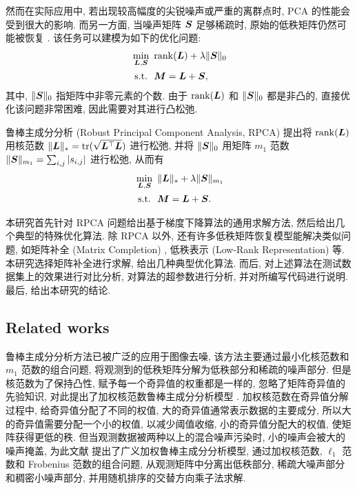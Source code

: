 \documentclass[12pt]{article}
\begin{document}
然而在实际应用中, 若出现较高幅度的尖锐噪声或严重的离群点时, PCA 的性能会受到很大的影响. 而另一方面, 当噪声矩阵 $\bm{S}$ 足够稀疏时, 原始的低秩矩阵仍然可能被恢复 \cite{shi2013low}. 该任务可以建模为如下的优化问题: 
\begin{equation}
  \begin{aligned}
    &\min_{\bm{L},\bm{S}}~\operatorname{rank}(\bm{L})+\lambda\|\bm{S}\|_0 \\
    &~\text{s.t.}~~\bm{M}=\bm{L}+\bm{S},
  \end{aligned}
\end{equation}
其中, $\|\bm{S}\|_0$ 指矩阵中非零元素的个数. 由于 $\operatorname{rank}(\bm{L})$ 和 $\|\bm{S}\|_0$ 都是非凸的, 直接优化该问题非常困难, 因此需要对其进行凸松弛. 

鲁棒主成分分析 (Robust Principal Component Analysis, RPCA) \cite{candes2011robust} 提出将 $\operatorname{rank}(\bm{L})$ 用核范数 $\|\bm{L}\|_{*}=\operatorname{tr}(\sqrt{\bm{L}^\top\bm{L}})$ 进行松弛, 并将 $\|\bm{S}\|_0$ 用矩阵 $m_1$ 范数 $\|\bm{S}\|_{m_1}=\sum_{i,j}|s_{i,j}|$ 进行松弛, 从而有
\begin{equation}
  \label{eq:rpca}
  \begin{aligned}
    &\min_{\bm{L},\bm{S}}~\|\bm{L}\|_{*}+\lambda\|\bm{S}\|_{m_1} \\
    &~\text{s.t.}~~\bm{M}=\bm{L}+\bm{S}.
  \end{aligned}
\end{equation}

本研究首先针对 RPCA 问题给出基于梯度下降算法的通用求解方法, 然后给出几个典型的特殊优化算法. 除 RPCA 以外, 还有许多低秩矩阵恢复模型能解决类似问题, 如矩阵补全 (Matrix Completion) \cite{candes2012exact}, 低秩表示 (Low-Rank Representation) \cite{liu2012robust} 等. 本研究选择矩阵补全进行求解, 给出几种典型优化算法. 而后, 对上述算法在测试数据集上的效果进行对比分析, 对算法的超参数进行分析, 并对所编写代码进行说明. 最后, 给出本研究的结论.

\subsection*{Related works}

鲁棒主成分分析方法已被广泛的应用于图像去噪, 该方法主要通过最小化核范数和 $m_1$ 范数的组合问题, 将观测到的低秩矩阵分解为低秩部分和稀疏的噪声部分. 但是核范数为了保持凸性, 赋予每一个奇异值的权重都是一样的, 忽略了矩阵奇异值的先验知识, 对此提出了加权核范数鲁棒主成分分析模型 \cite{gu2014weighted}. 加权核范数在奇异值分解过程中, 给奇异值分配了不同的权值, 大的奇异值通常表示数据的主要成分, 所以大的奇异值需要分配一个小的权值, 以减少阈值收缩, 小的奇异值分配大的权值, 使矩阵获得更低的秩. 但当观测数据被两种以上的混合噪声污染时, 小的噪声会被大的噪声掩盖, 为此文献 \cite{wang2021generalized} 提出了广义加权鲁棒主成分分析模型, 通过加权核范数, $\ell_1$ 范数和 Frobenius 范数的组合问题, 从观测矩阵中分离出低秩部分, 稀疏大噪声部分和稠密小噪声部分, 并用随机排序的交替方向乘子法求解.
\end{document}
